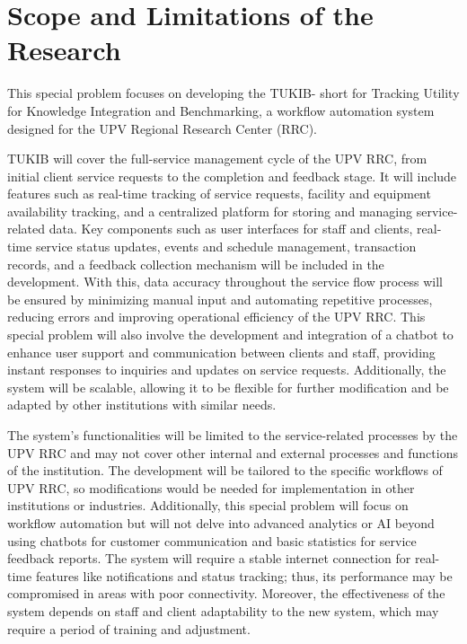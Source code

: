 \section{Scope and Limitations of the Research}
\label{sec:scopelimitations}

This special problem focuses on developing the TUKIB- short for Tracking Utility for Knowledge Integration and Benchmarking, a workflow automation system designed for the UPV Regional Research Center (RRC). 

TUKIB will cover the full-service management cycle of the UPV RRC, from initial client service requests to the completion and feedback stage. It will include features such as real-time tracking of service requests, facility and equipment availability tracking, and a centralized platform for storing and managing service-related data. Key components such as user interfaces for staff and clients, real-time service status updates, events and schedule management, transaction records, and a feedback collection mechanism will be included in the development. With this, data accuracy throughout the service flow process will be ensured by minimizing manual input and automating repetitive processes, reducing errors and improving operational efficiency of the UPV RRC. This special problem will also involve the development and integration of a chatbot to enhance user support and communication between clients and staff, providing instant responses to inquiries and updates on service requests. Additionally, the system will be scalable, allowing it to be flexible for further modification and be adapted by other institutions with similar needs.

The system’s functionalities will be limited to the service-related processes by the UPV RRC and may not cover other internal and external processes and functions of the institution. The development will be tailored to the specific workflows of UPV RRC, so modifications would be needed for implementation in other institutions or industries. Additionally, this special problem will focus on workflow automation but will not delve into advanced analytics or AI beyond using chatbots for customer communication and basic statistics for service feedback reports. The system will require a stable internet connection for real-time features like notifications and status tracking; thus, its performance may be compromised in areas with poor connectivity. Moreover, the effectiveness of the system depends on staff and client adaptability to the new system, which may require a period of training and adjustment.

